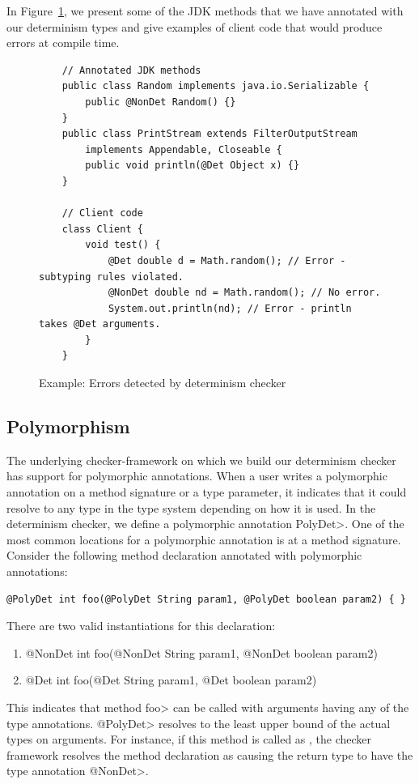 In Figure~\ref{code-determinism}, we present some of the JDK methods that we have annotated with our determinism types and give examples of
client code that would produce errors at compile time.
\begin{figure}
    \begin{verbatim}
    // Annotated JDK methods
    public class Random implements java.io.Serializable {
        public @NonDet Random() {}
    }
    public class PrintStream extends FilterOutputStream 
        implements Appendable, Closeable {
        public void println(@Det Object x) {}
    }
    
    // Client code
    class Client {
        void test() {
            @Det double d = Math.random(); // Error - subtyping rules violated.
            @NonDet double nd = Math.random(); // No error.
            System.out.println(nd); // Error - println takes @Det arguments.
        }
    }
    \end{verbatim}
    \caption{Example: Errors detected by determinism checker}
    \label{code-determinism}
\end{figure}

\subsection{Polymorphism}\label{polymorphism}

The underlying checker-framework on which we build our determinism checker has support for
polymorphic annotations. When a user writes a polymorphic annotation on a method signature or a type parameter,
it indicates that it could resolve to any type in the type system depending on how it is used.
In the determinism checker, we define a polymorphic annotation \<PolyDet>.
One of the most common locations for a polymorphic annotation is at a method signature.
Consider the following method declaration annotated with polymorphic annotations:
\begin{verbatim}
@PolyDet int foo(@PolyDet String param1, @PolyDet boolean param2) { }
\end{verbatim}
There are two valid instantiations for this declaration:
\begin{enumerate}
    \item @NonDet int foo(@NonDet String param1, @NonDet boolean param2) { }
    \item @Det int foo(@Det String param1, @Det boolean param2) { }
\end{enumerate}
This indicates that method \<foo> can be called with arguments having any of the  type annotations.
 \<@PolyDet> resolves to the least upper bound of
the actual types on arguments. For instance, if this method is called as , the 
checker framework resolves the method declaration as 
causing the return type to have the type annotation \<@NonDet>.


